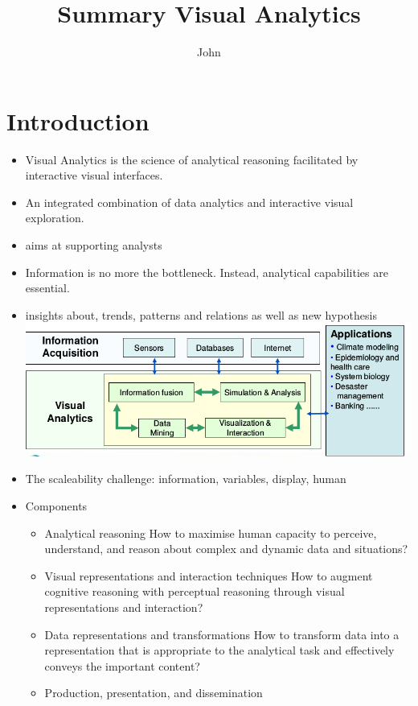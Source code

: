 \documentclass[11pt,ngerman]{article}
\begin{document}
\title{Summary Visual Analytics}
\author{John}
\maketitle

\tableofcontents
\newpage

\section{Introduction}
\begin{itemize}
	\item Visual Analytics is the science of analytical
reasoning facilitated by interactive visual interfaces.
	\item An integrated combination of data analytics and
interactive visual exploration.
	\item aims at supporting analysts
	\item Information is no more the bottleneck. Instead, analytical capabilities are essential.
	\item insights about,
trends,
patterns and
relations as well as
new hypothesis\\
\includegraphics[width=5in]{images/Selection_001.png}\\
	\item The scaleability challenge: information, variables, display, human
	\item Components
	\begin{itemize}
		\item Analytical reasoning
How to maximise human capacity to perceive, understand, and
reason about complex and dynamic data and situations?
\item Visual representations and interaction techniques
How to augment cognitive reasoning with perceptual reasoning
through visual representations and interaction?
\item Data representations and transformations
How to transform data into a representation that is appropriate to
the analytical task and effectively conveys the important content?
\item Production, presentation, and dissemination

\end{itemize}
\end{itemize}
\end{document}
